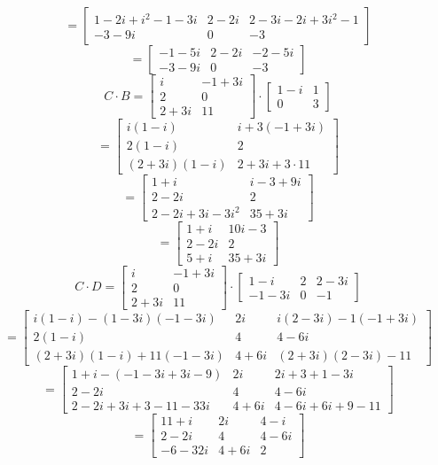 \documentclass[11pt]{article}
\begin{document}
					$$=\begin{bmatrix}1-2i+i^2-1-3i&2-2i&2-3i-2i+3i^2-1\\-3-9i&0&-3\end{bmatrix}$$
					$$=\begin{bmatrix}-1-5i&2-2i&-2-5i\\-3-9i&0&-3\end{bmatrix}$$
					$$C\cdot B=\begin{bmatrix}i&-1+3i\\2&0\\2+3i&11\end{bmatrix}\cdot \begin{bmatrix}1-i&1\\0&3\end{bmatrix}$$
					$$=\begin{bmatrix}i(1-i)&i+3(-1+3i)\\2(1-i)&2\\(2+3i)(1-i)&2+3i+3 \cdot 11 \end{bmatrix}$$
					$$=\begin{bmatrix}1+i&i-3+9i\\2-2i&2\\2-2i+3i-3i^2&35+3i\end{bmatrix}$$
					$$=\begin{bmatrix}1+i&10i-3\\2-2i&2\\5+i&35+3i\end{bmatrix}$$
					$$C\cdot D= \begin{bmatrix}i&-1+3i\\2&0\\2+3i&11\end{bmatrix}\cdot \begin{bmatrix}1-i&2&2-3i\\-1-3i&0&-1\end{bmatrix}$$
					$$=\begin{bmatrix}i(1-i)-(1-3i)(-1-3i)&2i&i(2-3i)-1(-1+3i)\\2(1-i)&4&4-6i\\(2+3i)(1-i)+11(-1-3i)&4+6i&(2+3i)(2-3i)-11\end{bmatrix}$$
					$$=\begin{bmatrix}1+i-(-1-3i+3i-9)&2i&2i+3+1-3i\\2-2i&4&4-6i\\2-2i+3i+3-11-33i&4+6i&4-6i+6i+9-11\end{bmatrix}$$
					$$=\begin{bmatrix}11+i&2i&4-i\\2-2i&4&4-6i\\-6-32i&4+6i&2\end{bmatrix}$$
\end{document}

